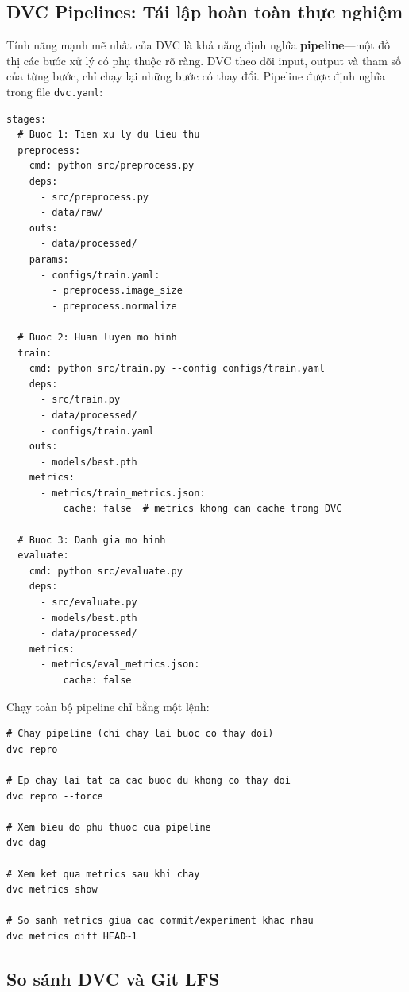 \subsection{DVC Pipelines: Tái lập hoàn toàn thực nghiệm}
\label{subsec:dvc_pipelines}

Tính năng mạnh mẽ nhất của DVC là khả năng định nghĩa \textbf{pipeline}---một đồ thị các bước xử lý có phụ thuộc rõ ràng. DVC theo dõi input, output và tham số của từng bước, chỉ chạy lại những bước có thay đổi. Pipeline được định nghĩa trong file \texttt{dvc.yaml}:

\begin{verbatim}
stages:
  # Buoc 1: Tien xu ly du lieu thu
  preprocess:
    cmd: python src/preprocess.py
    deps:
      - src/preprocess.py
      - data/raw/
    outs:
      - data/processed/
    params:
      - configs/train.yaml:
        - preprocess.image_size
        - preprocess.normalize

  # Buoc 2: Huan luyen mo hinh
  train:
    cmd: python src/train.py --config configs/train.yaml
    deps:
      - src/train.py
      - data/processed/
      - configs/train.yaml
    outs:
      - models/best.pth
    metrics:
      - metrics/train_metrics.json:
          cache: false  # metrics khong can cache trong DVC

  # Buoc 3: Danh gia mo hinh
  evaluate:
    cmd: python src/evaluate.py
    deps:
      - src/evaluate.py
      - models/best.pth
      - data/processed/
    metrics:
      - metrics/eval_metrics.json:
          cache: false
\end{verbatim}

Chạy toàn bộ pipeline chỉ bằng một lệnh:

\begin{verbatim}
# Chay pipeline (chi chay lai buoc co thay doi)
dvc repro

# Ep chay lai tat ca cac buoc du khong co thay doi
dvc repro --force

# Xem bieu do phu thuoc cua pipeline
dvc dag

# Xem ket qua metrics sau khi chay
dvc metrics show

# So sanh metrics giua cac commit/experiment khac nhau
dvc metrics diff HEAD~1
\end{verbatim}

\subsection{So sánh DVC và Git LFS}
\label{subsec:dvc_vs_gitlfs}

